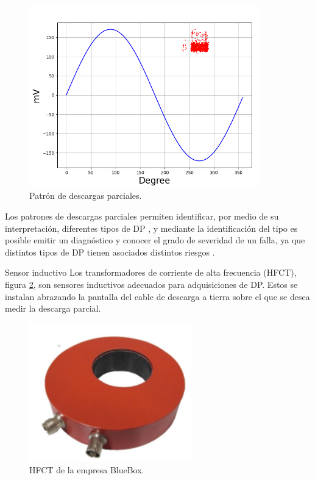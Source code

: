 \begin{figure}[!ht]
	\centering
	\includegraphics[width=100mm]{./Figures/patronEjemplo.png}
	\caption{Patrón de descargas parciales.}
	\label{fig:patronEjemplo}
\end{figure}

Los patrones de descargas parciales permiten identificar, por medio de su interpretación, diferentes tipos de DP \citep{Gulski:citation}, y mediante la identificación del tipo es posible emitir un diagnóstico y conocer el grado de severidad de un falla, ya que distintos tipos de DP tienen asociados distintos riesgos \citep{Cavallini:citation}.

Sensor inductivo
Los transformadores de corriente de alta frecuencia (HFCT), figura \ref{fig:hfct}, son sensores inductivos adecuados para adquisiciones de DP. Estos se instalan abrazando la pantalla del cable de descarga a tierra sobre el que se desea medir la descarga parcial. 

\begin{figure}[ht]
	\centering
	\includegraphics[width=70mm]{./Figures/hfct.png}
	\caption{HFCT de la empresa BlueBox.}
	\label{fig:hfct}
\end{figure}

